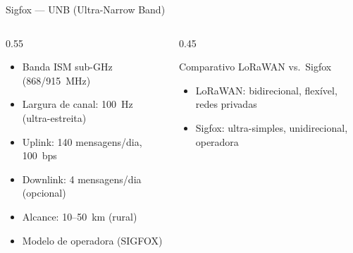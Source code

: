 \documentclass[aspectratio=169,11pt]{beamer}
\begin{document}
\begin{frame}{Sigfox --- UNB (Ultra-Narrow Band)}
  \begin{columns}
    \begin{column}{0.55\textwidth}
      \begin{itemize}
        \item Banda ISM sub-GHz (868/915~MHz)
        \item Largura de canal: 100~Hz (ultra-estreita)
        \item Uplink: 140 mensagens/dia, 100~bps
        \item Downlink: 4 mensagens/dia (opcional)
        \item Alcance: 10--50~km (rural)
        \item Modelo de operadora (SIGFOX)
      \end{itemize}
    \end{column}
    \begin{column}{0.45\textwidth}
      \begin{block}{Comparativo LoRaWAN vs.\ Sigfox}
        \begin{itemize}
          \item LoRaWAN: bidirecional, flexível, redes privadas
          \item Sigfox: ultra-simples, unidirecional, operadora
        \end{itemize}
      \end{block}
    \end{column}
  \end{columns}
\end{frame}
\end{document}
